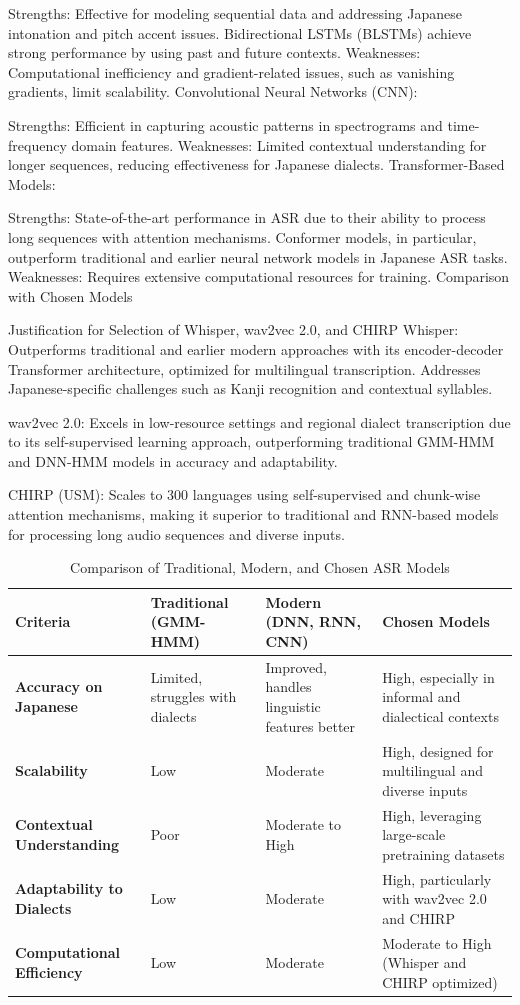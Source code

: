 Strengths: Effective for modeling sequential data and addressing Japanese intonation and pitch accent issues. Bidirectional LSTMs (BLSTMs) achieve strong performance by using past and future contexts.
Weaknesses: Computational inefficiency and gradient-related issues, such as vanishing gradients, limit scalability.
Convolutional Neural Networks (CNN):

Strengths: Efficient in capturing acoustic patterns in spectrograms and time-frequency domain features.
Weaknesses: Limited contextual understanding for longer sequences, reducing effectiveness for Japanese dialects.
Transformer-Based Models:

Strengths: State-of-the-art performance in ASR due to their ability to process long sequences with attention mechanisms. Conformer models, in particular, outperform traditional and earlier neural network models in Japanese ASR tasks.
Weaknesses: Requires extensive computational resources for training.
Comparison with Chosen Models


Justification for Selection of Whisper, wav2vec 2.0, and CHIRP
Whisper:
Outperforms traditional and earlier modern approaches with its encoder-decoder Transformer architecture, optimized for multilingual transcription.
Addresses Japanese-specific challenges such as Kanji recognition and contextual syllables.

wav2vec 2.0:
Excels in low-resource settings and regional dialect transcription due to its self-supervised learning approach, outperforming traditional GMM-HMM and DNN-HMM models in accuracy and adaptability.

CHIRP (USM):
Scales to 300 languages using self-supervised and chunk-wise attention mechanisms, making it superior to traditional and RNN-based models for processing long audio sequences and diverse inputs.

\begin{table}[ht]
    \centering
    \caption{Comparison of Traditional, Modern, and Chosen ASR Models}
    \begin{tabular}{p{2.5cm}|p{3.5cm}|p{3.5cm}|p{3.5cm}}
    \hline
    \textbf{Criteria} & \textbf{Traditional (GMM-HMM)} & \textbf{Modern (DNN, RNN, CNN)} & \textbf{Chosen Models} \\ \hline
    \textbf{Accuracy on Japanese} & Limited, struggles with dialects & Improved, handles linguistic features better & High, especially in informal and dialectical contexts \\ \hline
    \textbf{Scalability} & Low & Moderate & High, designed for multilingual and diverse inputs \\ \hline
    \textbf{Contextual Understanding} & Poor & Moderate to High & High, leveraging large-scale pretraining datasets \\ \hline
    \textbf{Adaptability to Dialects} & Low & Moderate & High, particularly with wav2vec 2.0 and CHIRP \\ \hline
    \textbf{Computational Efficiency} & Low & Moderate & Moderate to High (Whisper and CHIRP optimized) \\ \hline
    \end{tabular}
    \label{tab:comparison_models}
\end{table}

